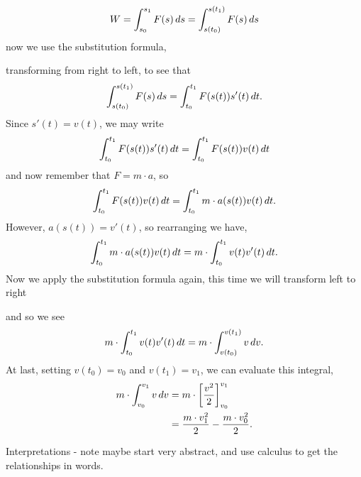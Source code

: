 \documentclass{ximera}
\begin{document}
\begin{theorem}
\begin{explanation}
  \[
  W = \int_{s_0}^{s_1} F(s) \,d s = \int_{s(t_0)}^{s(t_1)} F(s) \,d s
  \]
  now we use the substitution formula,
  \begin{image}
  \end{image} 
  transforming from right to left, to see that
  \[
  \int_{s(t_0)}^{s(t_1)} F(s) \,d s = \int_{t_0}^{t_1} F(s(t)) s'(t) \,d t.
  \]
  Since $s'(t) = v(t)$, we may write
  \[
  \int_{t_0}^{t_1} F(s(t)) s'(t) \,d t = \int_{t_0}^{t_1} F(s(t)) v(t) \,d t
  \]
  and now remember that $F=m\cdot a$, so
  \[
  \int_{t_0}^{t_1} F(s(t)) v(t) \,d t = \int_{t_0}^{t_1} m\cdot a(s(t)) v(t) \,d t.
  \]
  However, $a(s(t)) = v'(t)$, so rearranging we have,
  \[
  \int_{t_0}^{t_1} m\cdot a(s(t)) v(t) \,d t = m\cdot \int_{t_0}^{t_1} v(t) v'(t)\,d t.
  \]
  Now we apply the substitution formula again, this time we will transform left to right
  \begin{image}
  \end{image}
  and so we see
  \[
  m\cdot \int_{t_0}^{t_1} v(t) v'(t)\,d t = m\cdot \int_{v(t_0)}^{v(t_1)} v \,d v.
  \]
  At last, setting $v(t_0) = v_0$ and $v(t_1) = v_1$, we can evaluate
  this integral,
  \begin{align*}
    m \cdot \int_{v_0}^{v_1} v \,d v &= m \cdot \bigg[ \frac{v^2}{2} \bigg]_{v_0}^{v_1}\\
    &=\frac{m\cdot v_1^2}{2} - \frac{m\cdot v_0^2}{2}.
  \end{align*}
\end{explanation}
\end{theorem}
  Interpretations - note maybe start very abstract, and use calculus to get the relationships in words.
\end{document}
